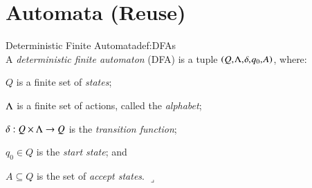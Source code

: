 \section{Automata (Reuse)}
\label{sec:reuse:automata}

\begin{ncdefine}{Deterministic Finite Automata}{def:DFAs}{\quad\\}
A \emph{deterministic finite automaton} (DFA) is a tuple $\tuple{Q,\actions,\delta,q_0,A}$, where:
\begin{compactitem}
\item
$Q$ is a finite set of \emph{states};
\item
${\Lambda}$ is a finite set of actions, called the \emph{alphabet};
\item
${{\delta}:{Q \times {\ensuremath \Lambda}} \rightarrow {Q}}$ is the \emph{transition function};
\item
$q_0 \in Q$ is the \emph{start state}; and
\item
$A \subseteq Q$ is the set of \emph{accept states}.
\hfill\ensuremath{\lrcorner}
\end{compactitem}
\end{ncdefine}


